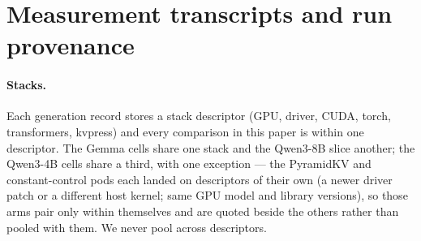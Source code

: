 \documentclass{article}
\begin{document}
\section{Measurement transcripts and run provenance}
\label{app:provenance}

\paragraph{Stacks.}
Each generation record stores a stack descriptor (GPU, driver, CUDA,
torch, transformers, kvpress) and every comparison in this paper is
within one descriptor. The Gemma cells share one stack and the Qwen3-8B
slice another; the Qwen3-4B cells share a third, with one exception ---
the PyramidKV and constant-control pods each landed on descriptors of
their own (a newer driver patch or a different host kernel; same GPU
model and library versions), so those arms pair only within themselves
and are quoted beside the others rather than pooled with them. We never pool across descriptors.
\end{document}
